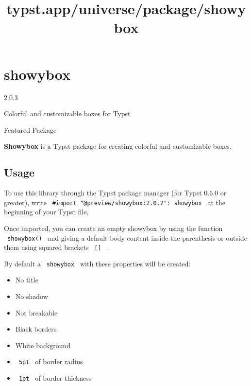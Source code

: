 \title{typst.app/universe/package/showybox}

\label{banner}
\section{showybox}\label{showybox}

{ 2.0.3 }

Colorful and customizable boxes for Typst

{ } Featured Package

\label{readme}
\textbf{Showybox} is a Typst package for creating colorful and
customizable boxes.

\subsection{Usage}\label{usage}

To use this library through the Typst package manager (for Typst 0.6.0
or greater), write
\texttt{\ \#import\ "@preview/showybox:2.0.2":\ showybox\ } at the
beginning of your Typst file.

Once imported, you can create an empty showybox by using the function
\texttt{\ showybox()\ } and giving a default body content inside the
parenthesis or outside them using squared brackets \texttt{\ {[}{]}\ } .

By default a \texttt{\ showybox\ } with these properties will be
created:

\begin{itemize}
\tightlist
\item
  No title
\item
  No shadow
\item
  Not breakable
\item
  Black borders
\item
  White background
\item
  \texttt{\ 5pt\ } of border radius
\item
  \texttt{\ 1pt\ } of border thickness
\end{itemize}

\begin{Shaded}
\begin{Highlighting}[]

\NormalTok{)}
\end{Highlighting}
\end{Shaded}

\subsubsection{\texorpdfstring{\protect{}}{Hello world! example}}\label{hello-world-example}

